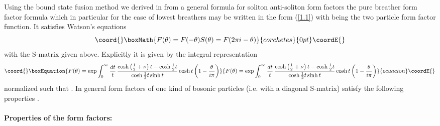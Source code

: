 \documentclass[a4paper,a4paper]{article}
\begin{document}
Using the bound state fusion method we derived in \cite{BK} from a general
formula for soliton anti-soliton form factors the pure breather form factor
formula which in particular for the case of lowest breathers may be written
in the form (\ref{1.1}) with \coordHE{} being the two particle form factor
function. It satisfies Watson's equations 
\[\coord{}\boxMath{
F(\theta )=F(-\theta )S(\theta )=F(2\pi i-\theta ) 
}{corchetes}{0pt}\coordE{}\]
with the S-matrix given above. Explicitly it is given by the integral
representation \cite{KW} 
\begin{equation}\coord{}\boxEquation{
F(\theta )=\exp \int_{0}^{\infty }\frac{dt}{t}\,\frac{\cosh \left( \frac{1}{2
}+\nu \right) t-\cosh \frac{1}{2}t}{\cosh \frac{1}{2}t\sinh t}\cosh t\left(
1-\frac{\theta }{i\pi }\right)  \label{2.1}
}{
F(\theta )=\exp \int_{0}^{\infty }\frac{dt}{t}\,\frac{\cosh \left( \frac{1}{2
}+\nu \right) t-\cosh \frac{1}{2}t}{\cosh \frac{1}{2}t\sinh t}\cosh t\left(
1-\frac{\theta }{i\pi }\right)  }{ecuacion}\coordE{}\end{equation}
normalized such that \coordHE{}. In general form factors of one kind of
bosonic particles (i.e. with a diagonal S-matrix) satisfy the following
properties \cite{KW,Sm,BFKZ}.

\paragraph{Properties of the form factors:}
\end{document}
